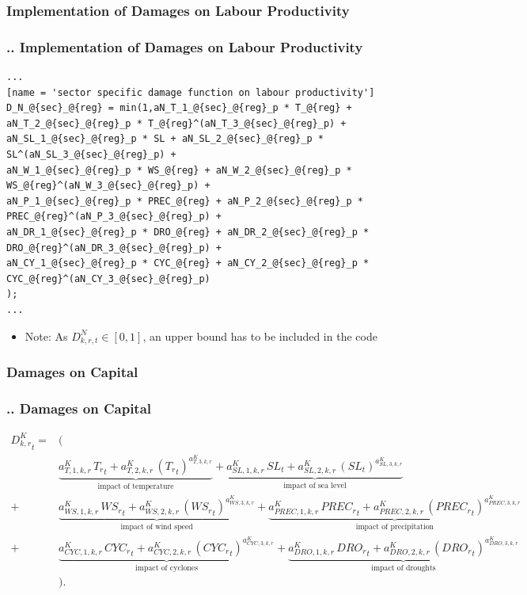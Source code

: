 \documentclass[11pt,aspectratio=169]{beamer}
\begin{document}
\subsubsection{Implementation of Damages on Labour Productivity}
\begin{frame}[fragile]
\frametitle{{\thesection.\thesubsection.\thesubsubsection} Implementation of Damages on Labour Productivity}
\begin{lstlisting}[frame = single]
...
[name = 'sector specific damage function on labour productivity']
D_N_@{sec}_@{reg} = min(1,aN_T_1_@{sec}_@{reg}_p * T_@{reg} + aN_T_2_@{sec}_@{reg}_p * T_@{reg}^(aN_T_3_@{sec}_@{reg}_p) + 
aN_SL_1_@{sec}_@{reg}_p * SL + aN_SL_2_@{sec}_@{reg}_p * SL^(aN_SL_3_@{sec}_@{reg}_p) +
aN_W_1_@{sec}_@{reg}_p * WS_@{reg} + aN_W_2_@{sec}_@{reg}_p * WS_@{reg}^(aN_W_3_@{sec}_@{reg}_p) + 
aN_P_1_@{sec}_@{reg}_p * PREC_@{reg} + aN_P_2_@{sec}_@{reg}_p * PREC_@{reg}^(aN_P_3_@{sec}_@{reg}_p) + 
aN_DR_1_@{sec}_@{reg}_p * DRO_@{reg} + aN_DR_2_@{sec}_@{reg}_p * DRO_@{reg}^(aN_DR_3_@{sec}_@{reg}_p) +
aN_CY_1_@{sec}_@{reg}_p * CYC_@{reg} + aN_CY_2_@{sec}_@{reg}_p * CYC_@{reg}^(aN_CY_3_@{sec}_@{reg}_p)
);
...
\end{lstlisting}
\begin{itemize}
	\item Note: As $D_{k,r,t}^N \in [0,1]$, an upper bound has to be included in the code
\end{itemize}
\end{frame}


\subsubsection{Damages on Capital}
\begin{frame}
\frametitle{{\thesection.\thesubsection.\thesubsubsection} Damages on Capital}
\scriptsize
\begin{align*}
{{D^{K}_{k,r}}_{t}}=& \Big( \nonumber \\
&\underbrace{{{a^{K}_{T,1,k,r}}} \, {{T_{r}}_{t}}+{{a^{K}_{T,2,k,r}}}\, \left({T_{r}}_{t}\right)^{a^{K}_{T,3,k,r}}}_{\mbox{impact of temperature}}+ \underbrace{{{a^{K}_{SL,1,k,r}}}\, {{SL}_{t}}+{{a^{K}_{SL,2,k,r}}}\, \left({SL}_{t}\right)^{{{a^{K}_{SL,3,k,r}}}}}_{\mbox{impact of sea level}} \nonumber \\
+ & \underbrace{{{a^{K}_{WS,1,k,r}}}\, {{WS_{r}}_{t}}+{{a^{K}_{WS,2,k,r}}}\, \left({WS_{r}}_{t}\right)^{{{a^{K}_{WS,3,k,r}}}}}_{\mbox{impact of wind speed}}
+ \underbrace{{{a^{K}_{PREC,1,k,r}}} \, {{PREC_{r}}_{t}}+{{a^{K}_{PREC,2,k,r}}}\, \left({PREC_{r}}_{t}\right)^{{{a^{K}_{PREC,3,k,r}}}}}_{\mbox{impact of precipitation}} \nonumber \\
+ & \underbrace{{{a^{K}_{CYC,1,k,r}}}\, {{CYC_{r}}_{t}}+{{a^{K}_{CYC,2,k,r}}}\, \left({CYC_{r}}_{t}\right)^{{{a^{K}_{CYC,3,k,r}}}}}_{\mbox{impact of cyclones}}
+ \underbrace{{{a^{K}_{DRO,1,k,r}}} \, {{DRO_{r}}_{t}}+{{a^{K}_{DRO,2,k,r}}}\, \left({DRO_{r}}_{t}\right)^{{{a^{K}_{DRO,3,k,r}}}}}_{\mbox{impact of droughts}} \nonumber \\
&\Big).
\end{align*}
\end{frame}
\end{document}
